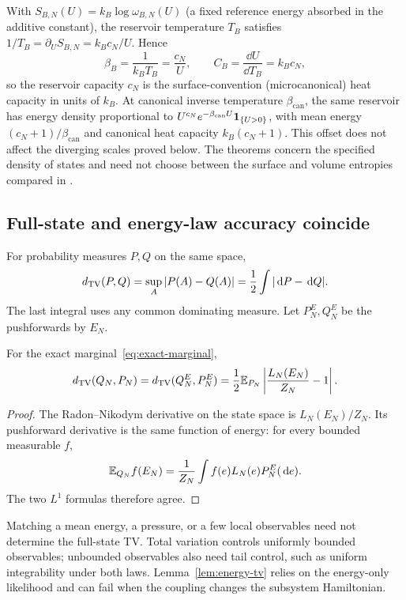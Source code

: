 With $S_{B,N}(U)=k_B\log\omega_{B,N}(U)$ (a fixed reference energy
absorbed in the additive constant), the reservoir temperature $T_B$
satisfies $1/T_B=\partial_U S_{B,N}=k_Bc_N/U$. Hence
\begin{equation}
 \beta_B=\frac{1}{k_BT_B}=\frac{c_N}{U},\qquad
 C_B=\frac{\dd U}{\dd T_B}=k_Bc_N,
 \label{eq:capacity-convention}
\end{equation}
so the reservoir capacity $c_N$ is the surface-convention
(microcanonical) heat capacity in units of $k_B$. At canonical
inverse temperature $\beta_{\mathrm{can}}$, the same reservoir has
energy density proportional to
$U^{c_N}e^{-\beta_{\mathrm{can}}U}\mathbf 1_{\{U>0\}}$, with mean energy
$(c_N+1)/\beta_{\mathrm{can}}$ and canonical heat capacity
$k_B(c_N+1)$. This offset does not affect the diverging scales proved
below. The theorems concern the specified density of states
and need not choose between the surface and volume entropies
compared in \cite{HilbertHanggiDunkel2014,DunkelHilbert2014}.

\subsection{Full-state and energy-law accuracy coincide}

For probability measures $P,Q$ on the same space,
\begin{equation}
 d_{\mathrm{TV}}(P,Q)=\sup_{A}|P(A)-Q(A)|
 =\frac12\int|\,\mathrm d P-\,\mathrm d Q|.
 \label{eq:tv-definition}
\end{equation}
The last integral uses any common dominating measure. Let
$P_N^E,Q_N^E$ be the pushforwards by $E_N$.

\begin{lemma}
\label{lem:energy-tv}
For the exact marginal~\eqref{eq:exact-marginal},
\begin{equation}
 d_{\mathrm{TV}}(Q_N,P_N)=d_{\mathrm{TV}}(Q_N^E,P_N^E)
 =\frac12\mathbb E_{P_N}\left|\frac{L_N(E_N)}{Z_N}-1\right|.
 \label{eq:energy-tv}
\end{equation}
\end{lemma}
\begin{proof}
The Radon--Nikodym derivative on the state space is $L_N(E_N)/Z_N$.
Its pushforward derivative is the same function of energy: for every
bounded measurable $f$,
\[
 \mathbb E_{Q_N}f(E_N)=\frac1{Z_N}\int f(e)L_N(e)P_N^E(\,\mathrm d e).
\]
The two $L^1$ formulas therefore agree.
\end{proof}

Matching a mean energy, a pressure, or a few local observables need
not determine the full-state TV. Total variation controls uniformly
bounded observables; unbounded observables also need tail control,
such as uniform integrability under both laws.
Lemma~\ref{lem:energy-tv} relies on the energy-only likelihood and can
fail when the coupling changes the subsystem Hamiltonian.

